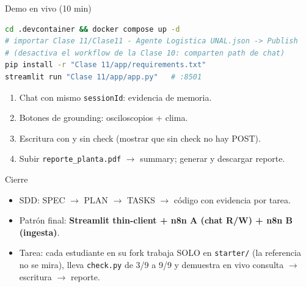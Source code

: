 \documentclass[aspectratio=169,11pt]{beamer}
\begin{document}
\begin{frame}[fragile]{Demo en vivo (10 min)}
\begin{lstlisting}[language=bash]
cd .devcontainer && docker compose up -d
# importar Clase 11/Clase11 - Agente Logistica UNAL.json -> Publish
# (desactiva el workflow de la Clase 10: comparten path de chat)
pip install -r "Clase 11/app/requirements.txt"
streamlit run "Clase 11/app/app.py"   # :8501
\end{lstlisting}
  \begin{enumerate}
    \item Chat con mismo \texttt{sessionId}: evidencia de memoria.
    \item Botones de grounding: osciloscopios + clima.
    \item Escritura con y sin check (mostrar que sin check no hay POST).
    \item Subir \texttt{reporte\_planta.pdf} $\to$ summary; generar y descargar reporte.
  \end{enumerate}
\end{frame}

\begin{frame}{Cierre}
  \begin{itemize}
    \item SDD: SPEC $\to$ PLAN $\to$ TASKS $\to$ código con evidencia por tarea.
    \item Patrón final: \textbf{Streamlit thin-client + n8n A (chat R/W) + n8n B (ingesta)}.
    \item Tarea: cada estudiante en su fork trabaja SOLO en \texttt{starter/} (la referencia no se mira), lleva \texttt{check.py} de 3/9 a 9/9 y demuestra en vivo consulta $\to$ escritura $\to$ reporte.
  \end{itemize}
\end{frame}
\end{document}
